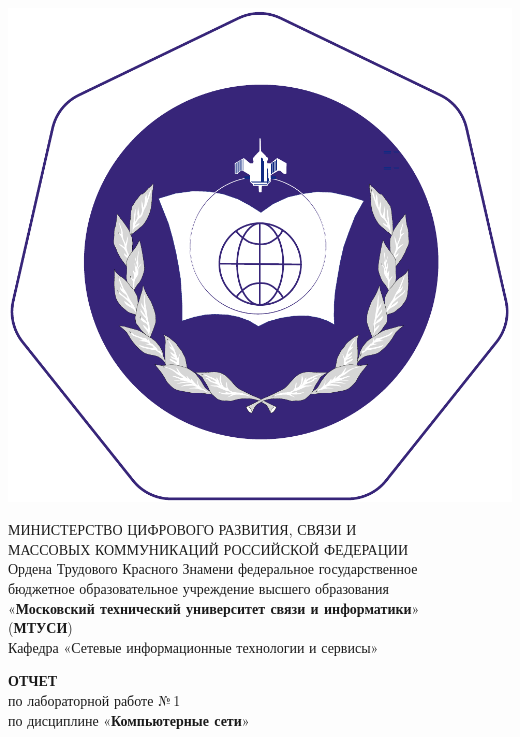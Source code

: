 \documentclass[14pt]{extarticle}
\begin{document}
{\par\centering %

\includegraphics[width=0.12\linewidth]{logo.pdf} %

МИНИСТЕРСТВО ЦИФРОВОГО РАЗВИТИЯ, СВЯЗИ И\\МАССОВЫХ КОММУНИКАЦИЙ РОССИЙСКОЙ ФЕДЕРАЦИИ\\[5mm] %

Ордена Трудового Красного Знамени федеральное государственное\\ бюджетное образовательное учреждение высшего образования\\ «\textbf{Московский технический университет связи и информатики}»\\(\textbf{МТУСИ})\\[5mm] 
	
Кафедра «Сетевые информационные технологии и сервисы»
\par}


\vfill\vfill %

{\par\centering
\textbf{ОТЧЕТ}\\ по лабораторной работе №\,1\\[5mm]

по дисциплине «\textbf{Компьютерные сети}»
\par}
\end{document}
